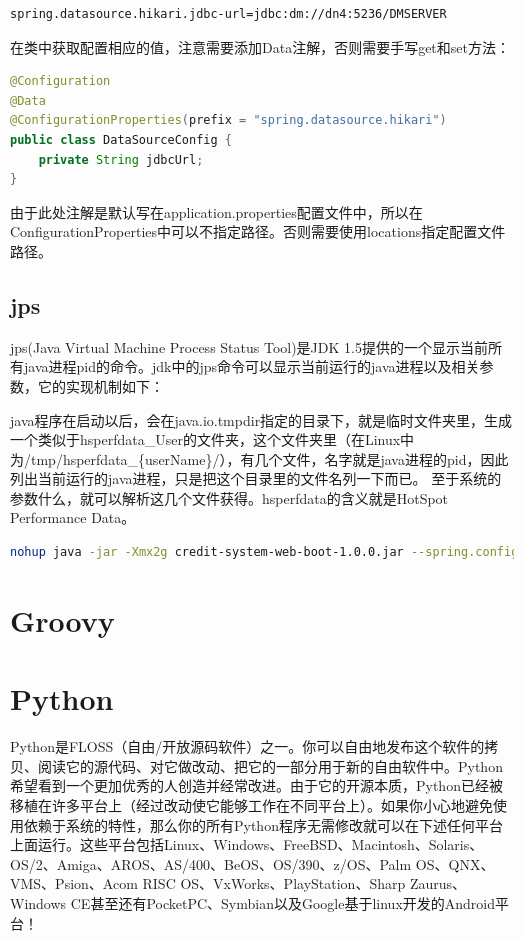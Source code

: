 \documentclass[letter]{book}
\begin{document}
\begin{lstlisting}
spring.datasource.hikari.jdbc-url=jdbc:dm://dn4:5236/DMSERVER
\end{lstlisting}

在类中获取配置相应的值，注意需要添加Data注解，否则需要手写get和set方法：

\begin{lstlisting}[language=Java]
@Configuration
@Data
@ConfigurationProperties(prefix = "spring.datasource.hikari")
public class DataSourceConfig {
	private String jdbcUrl;
}
\end{lstlisting}

由于此处注解是默认写在application.properties配置文件中，所以在ConfigurationProperties中可以不指定路径。否则需要使用locations指定配置文件路径。

\subsection{jps}

jps(Java Virtual Machine Process Status Tool)是JDK 1.5提供的一个显示当前所有java进程pid的命令。jdk中的jps命令可以显示当前运行的java进程以及相关参数，它的实现机制如下：

java程序在启动以后，会在java.io.tmpdir指定的目录下，就是临时文件夹里，生成一个类似于hsperfdata\_User的文件夹，这个文件夹里（在Linux中为/tmp/hsperfdata\_\{userName\}/），有几个文件，名字就是java进程的pid，因此列出当前运行的java进程，只是把这个目录里的文件名列一下而已。 至于系统的参数什么，就可以解析这几个文件获得。hsperfdata的含义就是HotSpot Performance Data。

\begin{lstlisting}[language=Bash]
nohup java -jar -Xmx2g credit-system-web-boot-1.0.0.jar --spring.config.location=application-jenkins.properties &
\end{lstlisting}


\newpage
\section*{Groovy}

\section{Python}

Python是FLOSS（自由/开放源码软件）之一。你可以自由地发布这个软件的拷贝、阅读它的源代码、对它做改动、把它的一部分用于新的自由软件中。Python希望看到一个更加优秀的人创造并经常改进。由于它的开源本质，Python已经被移植在许多平台上（经过改动使它能够工作在不同平台上）。如果你小心地避免使用依赖于系统的特性，那么你的所有Python程序无需修改就可以在下述任何平台上面运行。这些平台包括Linux、Windows、FreeBSD、Macintosh、Solaris、OS/2、Amiga、AROS、AS/400、BeOS、OS/390、z/OS、Palm OS、QNX、VMS、Psion、Acom RISC OS、VxWorks、PlayStation、Sharp Zaurus、Windows CE甚至还有PocketPC、Symbian以及Google基于linux开发的Android平台！
\end{document}
